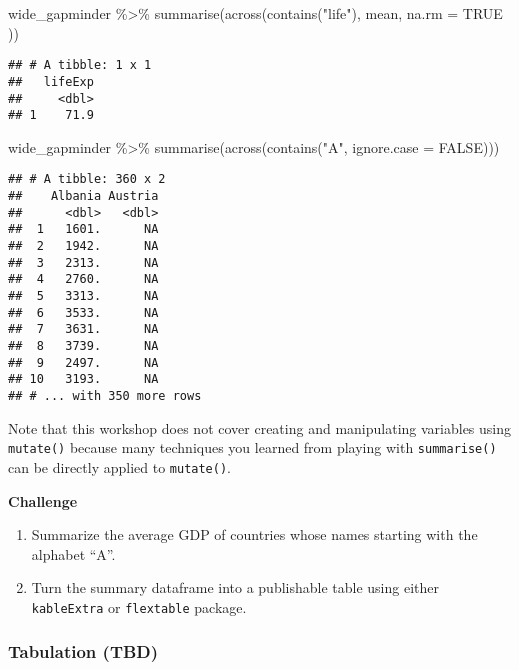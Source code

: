 \documentclass[
]{book}
\newenvironment{Shaded}{\begin{snugshade}}{\end{snugshade}}
\newcommand{\AttributeTok}[1]{\textcolor[rgb]{0.77,0.63,0.00}{#1}}
\newcommand{\ConstantTok}[1]{\textcolor[rgb]{0.00,0.00,0.00}{#1}}
\newcommand{\FunctionTok}[1]{\textcolor[rgb]{0.00,0.00,0.00}{#1}}
\newcommand{\NormalTok}[1]{#1}
\newcommand{\SpecialCharTok}[1]{\textcolor[rgb]{0.00,0.00,0.00}{#1}}
\newcommand{\StringTok}[1]{\textcolor[rgb]{0.31,0.60,0.02}{#1}}
\begin{document}
\begin{Shaded}
\begin{Highlighting}[]
\NormalTok{wide\_gapminder }\SpecialCharTok{\%\textgreater{}\%}
  \FunctionTok{summarise}\NormalTok{(}\FunctionTok{across}\NormalTok{(}\FunctionTok{contains}\NormalTok{(}\StringTok{"life"}\NormalTok{),}
\NormalTok{    mean,}
    \AttributeTok{na.rm =} \ConstantTok{TRUE}
\NormalTok{  ))}
\end{Highlighting}
\end{Shaded}

\begin{verbatim}
## # A tibble: 1 x 1
##   lifeExp
##     <dbl>
## 1    71.9
\end{verbatim}

\begin{Shaded}
\begin{Highlighting}[]
\NormalTok{wide\_gapminder }\SpecialCharTok{\%\textgreater{}\%}
  \FunctionTok{summarise}\NormalTok{(}\FunctionTok{across}\NormalTok{(}\FunctionTok{contains}\NormalTok{(}\StringTok{"A"}\NormalTok{, }\AttributeTok{ignore.case =} \ConstantTok{FALSE}\NormalTok{)))}
\end{Highlighting}
\end{Shaded}

\begin{verbatim}
## # A tibble: 360 x 2
##    Albania Austria
##      <dbl>   <dbl>
##  1   1601.      NA
##  2   1942.      NA
##  3   2313.      NA
##  4   2760.      NA
##  5   3313.      NA
##  6   3533.      NA
##  7   3631.      NA
##  8   3739.      NA
##  9   2497.      NA
## 10   3193.      NA
## # ... with 350 more rows
\end{verbatim}

Note that this workshop does not cover creating and manipulating variables using \texttt{mutate()} because many techniques you learned from playing with \texttt{summarise()} can be directly applied to \texttt{mutate()}.

\textbf{Challenge}

\begin{enumerate}
\def\labelenumi{\arabic{enumi}.}
\item
  Summarize the average GDP of countries whose names starting with the alphabet ``A''.
\item
  Turn the summary dataframe into a publishable table using either \texttt{kableExtra} or \texttt{flextable} package.
\end{enumerate}

\hypertarget{tabulation-tbd}{%
\subsubsection{Tabulation (TBD)}\label{tabulation-tbd}}
\end{document}
